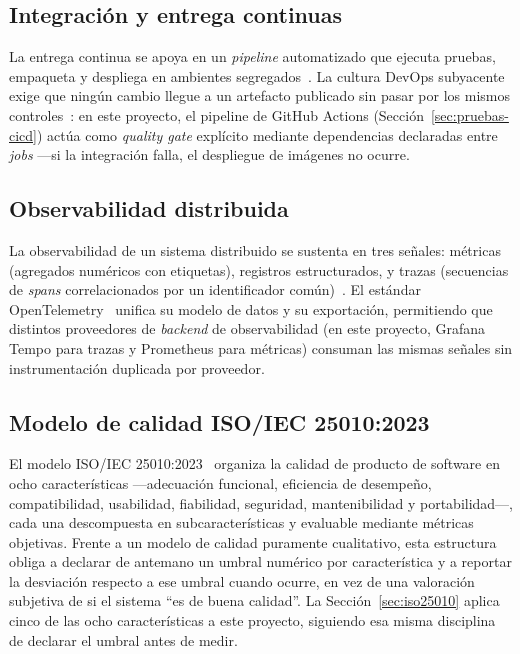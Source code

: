 \subsection{Integración y entrega continuas}

La entrega continua se apoya en un \emph{pipeline} automatizado que ejecuta pruebas, empaqueta y
despliega en ambientes segregados~\cite{humble2010continuous}. La cultura DevOps subyacente
exige que ningún cambio llegue a un artefacto publicado sin pasar por los mismos
controles~\cite{kim2021devops}: en este proyecto, el pipeline de GitHub Actions
(Sección~\ref{sec:pruebas-cicd}) actúa como \emph{quality gate} explícito mediante dependencias
declaradas entre \emph{jobs} —si la integración falla, el despliegue de imágenes no ocurre.

\subsection{Observabilidad distribuida}

La observabilidad de un sistema distribuido se sustenta en tres señales: métricas (agregados
numéricos con etiquetas), registros estructurados, y trazas (secuencias de \emph{spans}
correlacionados por un identificador común)~\cite{sigelman2010dapper,beyer2016sre}. El estándar
OpenTelemetry~\cite{opentelemetry2024spec} unifica su modelo de datos y su exportación,
permitiendo que distintos proveedores de \emph{backend} de observabilidad (en este proyecto,
Grafana Tempo para trazas y Prometheus para métricas) consuman las mismas señales sin
instrumentación duplicada por proveedor.

\subsection{Modelo de calidad ISO/IEC 25010:2023}

El modelo ISO/IEC 25010:2023~\cite{iso25010} organiza la calidad de producto de software en ocho
características —adecuación funcional, eficiencia de desempeño, compatibilidad, usabilidad,
fiabilidad, seguridad, mantenibilidad y portabilidad—, cada una descompuesta en
subcaracterísticas y evaluable mediante métricas objetivas. Frente a un modelo de calidad
puramente cualitativo, esta estructura obliga a declarar de antemano un umbral numérico por
característica y a reportar la desviación respecto a ese umbral cuando ocurre, en vez de una
valoración subjetiva de si el sistema ``es de buena calidad''. La Sección~\ref{sec:iso25010}
aplica cinco de las ocho características a este proyecto, siguiendo esa misma disciplina de
declarar el umbral antes de medir.

